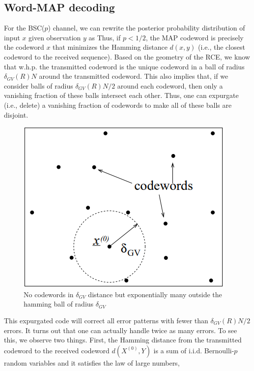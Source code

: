 \documentclass[letterpaper,english,10pt]{article}
\begin{document}
\subsection{Word-MAP decoding}
For the BSC($p$) channel, we can rewrite the posterior probability distribution of input $x$ given observation $y$ as 
Thus, if $p < 1/2$, the MAP codeword is precisely the codeword $x$ that minimizes the Hamming distance $d(x, y)$ (i.e., the closest codeword to the received sequence). 
Based on the geometry of the RCE, we know that w.h.p. the transmitted codeword is the unique codeword in a ball of radius $\delta_{GV}(R)N$ around the transmitted codeword. 
This also implies that, if we consider balls of radius $\delta_{GV}(R)N/2$ around each codeword, then only a vanishing fraction of these balls intersect each other. 
Thus, one can expurgate (i.e., delete) a vanishing fraction of codewords to make all of these balls are disjoint.\begin{figure}[h!]
    \centering
    \includegraphics[scale=0.5]{Figures/RCE2.png}
    \caption{No codewords in $\delta_{GV}$ distance but exponentially many outside the hamming ball of radius $\delta_{GV}$ }
    \label{fig:my_label}
\end{figure}  
This expurgated code will correct all error patterns with fewer than $\delta_{GV}(R)N/2$ errors.
It turns out that one can actually handle twice as many errors. 
To see this, we observe two things. 
First, the Hamming distance from the transmitted codeword to the received codeword $d(X^{(0)},Y)$ is a sum of i.i.d. Bernoulli-$p$ random variables and it satisfies the law of large numbers, 
\end{document}

